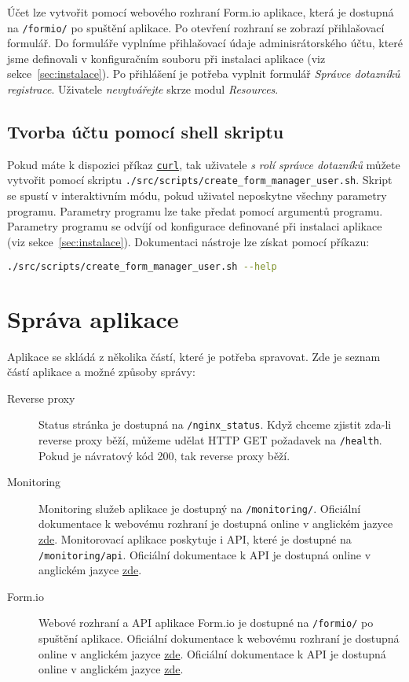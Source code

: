 Účet lze vytvořit pomocí webového rozhraní Form.io aplikace, která je dostupná na \lstinline{/formio/} po spuštění aplikace.
Po otevření rozhraní se zobrazí přihlašovací formulář.
Do formuláře vyplníme přihlašovací údaje adminisrátorského účtu, které jsme definovali v konfiguračním souboru při instalaci aplikace (viz sekce~\ref{sec:instalace}).
Po přihlášení je potřeba vyplnit formulář \textit{Správce dotazníků registrace}.
Uživatele \textit{nevytvářejte} skrze modul \textit{Resources}.

\subsection{Tvorba účtu pomocí shell skriptu}\label{subsec:tvorba-uctu-pomoci-shell-skriptu}

Pokud máte k dispozici příkaz \href{https://curl.se/}{\lstinline{curl}}, tak uživatele \textit{s rolí správce dotazníků} můžete vytvořit pomocí skriptu \lstinline{./src/scripts/create_form_manager_user.sh}.
Skript se spustí v interaktivním módu, pokud uživatel neposkytne všechny parametry programu.
Parametry programu lze take předat pomocí argumentů programu.
Parametry programu se odvíjí od konfigurace definované při instalaci aplikace (viz sekce~\ref{sec:instalace}).
Dokumentaci nástroje lze získat pomocí příkazu:

\begin{lstlisting}[language=bash]
./src/scripts/create_form_manager_user.sh --help
\end{lstlisting}


\section{Správa aplikace}\label{sec:sprava-aplikace}

Aplikace se skládá z několika částí, které je potřeba spravovat.
Zde je seznam částí aplikace a možné způsoby správy:

\begin{description}
    \item[Reverse proxy] Status stránka je dostupná na \lstinline{/nginx_status}.
    Když chceme zjistit zda-li reverse proxy běží, můžeme udělat HTTP GET požadavek na \lstinline{/health}.
    Pokud je návratový kód 200, tak reverse proxy běží.
    \item[Monitoring] Monitoring služeb aplikace je dostupný na \lstinline{/monitoring/}.
    Oficiální dokumentace k webovému rozhraní je dostupná online v anglickém jazyce \href{https://github.com/google/cadvisor/blob/master/docs/web.md}{zde}.
    Monitorovací aplikace poskytuje i API, které je dostupné na \lstinline{/monitoring/api}.
    Oficiální dokumentace k API je dostupná online v anglickém jazyce \href{https://github.com/google/cadvisor/blob/master/docs/api.md}{zde}.
    \item[Form.io] Webové rozhraní a API aplikace Form.io je dostupné na \lstinline{/formio/} po spuštění aplikace.
    Oficiální dokumentace k webovému rozhraní je dostupná online v anglickém jazyce \href{https://help.form.io/}{zde}.
    Oficiální dokumentace k API je dostupná online v anglickém jazyce \href{https://apidocs.form.io/}{zde}.
\end{description}

